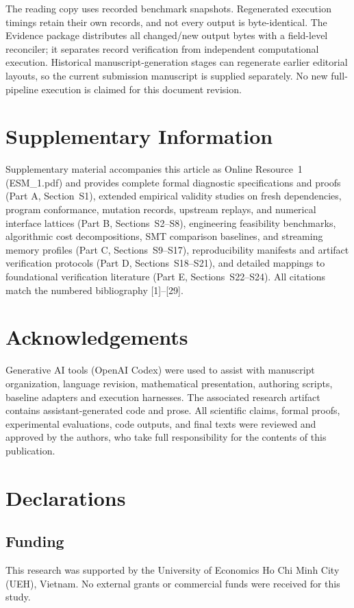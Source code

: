 \documentclass[11pt,a4paper]{article}
\begin{document}
The reading copy uses recorded benchmark snapshots. Regenerated execution timings retain their own records, and not every output is byte-identical. The Evidence package distributes all changed/new output bytes with a field-level reconciler; it separates record verification from independent computational execution. Historical manuscript-generation stages can regenerate earlier editorial layouts, so the current submission manuscript is supplied separately. No new full-pipeline execution is claimed for this document revision.


\section*{Supplementary Information}
Supplementary material accompanies this article as Online Resource~1 (ESM\_1.pdf) and provides complete formal diagnostic specifications and proofs (Part A, Section~S1), extended empirical validity studies on fresh dependencies, program conformance, mutation records, upstream replays, and numerical interface lattices (Part B, Sections~S2--S8), engineering feasibility benchmarks, algorithmic cost decompositions, SMT comparison baselines, and streaming memory profiles (Part C, Sections~S9--S17), reproducibility manifests and artifact verification protocols (Part D, Sections~S18--S21), and detailed mappings to foundational verification literature (Part E, Sections~S22--S24). All citations match the numbered bibliography [1]--[29].

\section*{Acknowledgements}
Generative AI tools (OpenAI Codex) were used to assist with manuscript organization, language revision, mathematical presentation, authoring scripts, baseline adapters and execution harnesses. The associated research artifact contains assistant-generated code and prose. All scientific claims, formal proofs, experimental evaluations, code outputs, and final texts were reviewed and approved by the authors, who take full responsibility for the contents of this publication.

\section*{Declarations}
\subsection*{Funding}
This research was supported by the University of Economics Ho Chi Minh City (UEH), Vietnam. No external grants or commercial funds were received for this study.
\end{document}
